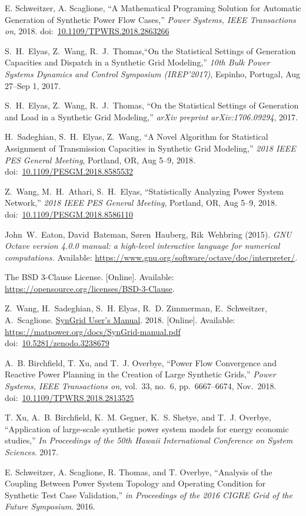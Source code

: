\documentclass[12pt]{article}
\newcommand{\syngrid}[0]{{SynGrid}}
\newcommand{\syngridver}[0]{1.0}
\newcommand{\syngridmanurl}[0]{http://www.pserc.cornell.edu/matpower/docs/SynGrid-manual-\syngridver.pdf}
\newcommand{\syngridman}[0]{\href{\syngridmanurl}{\syngrid{} User's Manual}}
\newcommand{\doi}[1]{doi:~\href{https://doi.org/#1}{#1}}
\numberwithin{equation}{section}
\numberwithin{table}{section}
\numberwithin{figure}{section}
\begin{document}
\begin{thebibliography}{99}
E. Schweitzer, A. Scaglione, ``A Mathematical Programing Solution for Automatic Generation of Synthetic Power Flow Cases,''  \emph{Power Systems, IEEE Transactions on}, 2018. \doi{10.1109/TPWRS.2018.2863266}

S.~H.~Elyas, Z.~Wang, R.~J.~Thomas,``On the Statistical Settings of Generation Capacities and Dispatch in a Synthetic Grid Modeling,'' \emph{10th Bulk Power Systems Dynamics and Control Symposium (IREP'2017)}, Espinho, Portugal, Aug 27--Sep 1, 2017.

S.~H.~Elyas, Z.~Wang, R.~J.~Thomas,
  ``On the Statistical Settings of Generation and Load in a Synthetic Grid Modeling,'' \emph{arXiv preprint arXiv:1706.09294}, 2017.

H.~Sadeghian, S.~H.~Elyas, Z.~Wang, ``A Novel Algorithm for Statistical Assignment of Transmission Capacities in Synthetic Grid Modeling,''
\emph{2018 IEEE PES General Meeting}, Portland, OR, Aug 5--9, 2018.
\doi{10.1109/PESGM.2018.8585532}

Z.~Wang, M.~H.~Athari, S.~H.~Elyas, ``Statistically Analyzing Power System Network,'' \emph{2018 IEEE PES General Meeting}, Portland, OR, Aug 5--9, 2018.
\doi{10.1109/PESGM.2018.8586110}

John~W.~Eaton, David~Bateman, S{\o}ren~Hauberg, Rik~Wehbring (2015). \emph{GNU Octave version 4.0.0 manual: a high-level interactive language for numerical computations.} Available: \url{https://www.gnu.org/software/octave/doc/interpreter/}.

The BSD 3-Clause License. [Online]. Available: \url{https://opensource.org/licenses/BSD-3-Clause}.

Z.~Wang, H.~Sadeghian, S.~H. Elyas, R.~D. Zimmerman, E.~Schweitzer,
A.~Scaglione. \syngridman{}. 2018.
[Online]. Available: \url{https://matpower.org/docs/SynGrid-manual.pdf}\\
\doi{10.5281/zenodo.3238679}

A.~B. Birchfield, T. Xu, and T.~J. Overbye, ``Power Flow Convergence and Reactive Power Planning in the Creation of Large Synthetic Grids,''  \emph{Power Systems, IEEE Transactions on}, vol.~33, no.~6, pp.~6667--6674, Nov.~2018.\\ \doi{10.1109/TPWRS.2018.2813525}

T. Xu, A.~B. Birchfield, K.~M. Gegner, K.~S. Shetye, and T.~J. Overbye, ``Application of large-scale synthetic power system models for energy economic studies,''  \emph{In Proceedings of the 50th Hawaii International Conference on System Sciences}. 2017.

E. Schweitzer, A. Scaglione, R. Thomas, and T. Overbye, ``Analysis of the Coupling Between Power System Topology and Operating Condition for Synthetic Test Case Validation,'' \emph{in Proceedings of the 2016 CIGRE Grid of the Future Symposium}. 2016.
\end{thebibliography}
\end{document}
